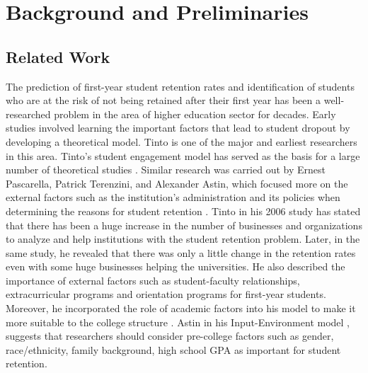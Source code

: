 \documentclass[11pt,openright]{report}
\begin{document}
\chapter{Background and Preliminaries} \label{chapter:background}
\section{Related Work}\label{section:relatedwork}

The prediction of first-year student retention rates and identification of students who are at the risk of not being retained after their first year has been a well-researched problem in the area of higher education sector for decades. Early studies involved learning the important factors that lead to student dropout by developing a theoretical model. Tinto is one of the major and earliest researchers in this area. Tinto's student engagement model \cite{tinto1999taking} has served as the basis for a large number of theoretical studies \cite{braxton2002introduction}. Similar research was carried out by Ernest Pascarella, Patrick Terenzini, and Alexander Astin, which focused more on the external factors such as the institution's administration and its policies when determining the reasons for student retention \cite{astin2012assessment}. Tinto in his 2006 study \cite{tinto2006} has stated that there has been a huge increase in the number of businesses and organizations to analyze and help institutions with the student retention problem. Later, in the same study, he revealed that there was only a little change in the retention rates even with some huge businesses helping the universities. He also described the importance of external factors such as student-faculty relationships, extracurricular programs and orientation programs for first-year students. Moreover, he incorporated the role of academic factors into his model to make it more suitable to the college structure \cite{tinto2006}. Astin in his Input-Environment model \cite{astin2012assessment}, suggests that researchers should consider pre-college factors such as gender, race/ethnicity, family background, high school GPA  as important for student retention.
\end{document}
